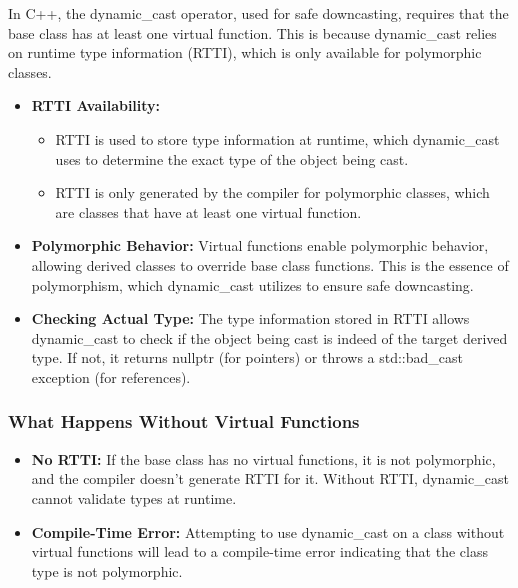 \documentclass{report}
\begin{document}
    \bigbreak \noindent 
    In C++, the dynamic\_cast operator, used for safe downcasting, requires that the base class has at least one virtual function. This is because dynamic\_cast relies on runtime type information (RTTI), which is only available for polymorphic classes.
    \bigbreak \noindent 
    \begin{itemize}
        \item \textbf{RTTI Availability:}
            \begin{itemize}
                \item RTTI is used to store type information at runtime, which dynamic\_cast uses to determine the exact type of the object being cast.
                \item RTTI is only generated by the compiler for polymorphic classes, which are classes that have at least one virtual function.
            \end{itemize}
        \item \textbf{Polymorphic Behavior:} Virtual functions enable polymorphic behavior, allowing derived classes to override base class functions. This is the essence of polymorphism, which dynamic\_cast utilizes to ensure safe downcasting.
        \item \textbf{Checking Actual Type:} The type information stored in RTTI allows dynamic\_cast to check if the object being cast is indeed of the target derived type. If not, it returns nullptr (for pointers) or throws a std::bad\_cast exception (for references).
    \end{itemize}

    \bigbreak \noindent 
    \subsubsection{What Happens Without Virtual Functions}
    \bigbreak \noindent 
    \begin{itemize}
        \item \textbf{No RTTI:} If the base class has no virtual functions, it is not polymorphic, and the compiler doesn't generate RTTI for it. Without RTTI, dynamic\_cast cannot validate types at runtime.
        \item \textbf{Compile-Time Error:} Attempting to use dynamic\_cast on a class without virtual functions will lead to a compile-time error indicating that the class type is not polymorphic.

    \end{itemize}
\end{document}
